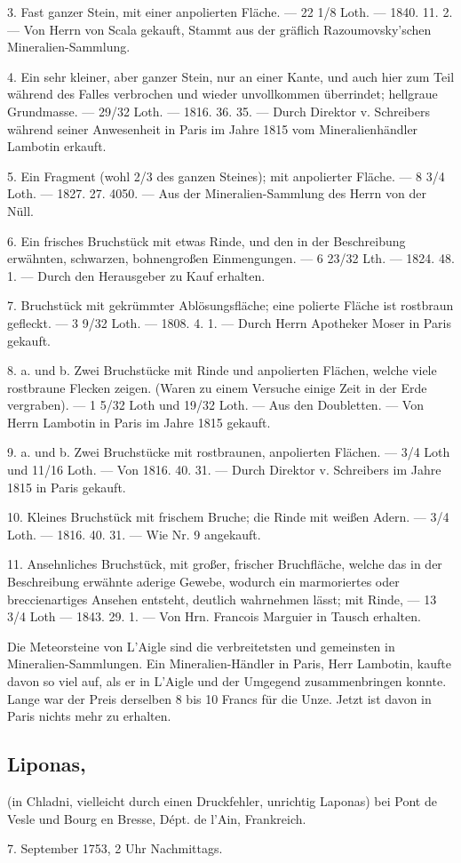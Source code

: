 \documentclass[a4paper, 11pt, oneside, polutonikogreek, german]{article}
\begin{document}
3. Fast ganzer Stein, mit einer anpolierten Fläche. — 22 1/8 Loth. — 1840. 11. 2. — Von Herrn von Scala gekauft, Stammt aus der gräflich Razoumovsky'schen Mineralien-Sammlung.

4. Ein sehr kleiner, aber ganzer Stein, nur an einer Kante, und auch hier zum Teil während des Falles verbrochen und wieder unvollkommen überrindet; hellgraue Grundmasse. — 29/32 Loth. — 1816. 36. 35. — Durch Direktor v. Schreibers während seiner Anwesenheit in Paris im Jahre 1815 vom Mineralienhändler Lambotin erkauft.

5. Ein Fragment (wohl 2/3 des ganzen Steines); mit anpolierter Fläche. — 8 3/4 Loth. — 1827. 27. 4050. — Aus der Mineralien-Sammlung des Herrn von der Nüll.

6. Ein frisches Bruchstück mit etwas Rinde, und den in der Beschreibung erwähnten, schwarzen, bohnengroßen Einmengungen. — 6 23/32 Lth. — 1824. 48. 1. — Durch den Herausgeber zu Kauf erhalten.

7. Bruchstück mit gekrümmter Ablösungsfläche; eine polierte Fläche ist rostbraun gefleckt. — 3 9/32 Loth. — 1808. 4. 1. — Durch Herrn Apotheker Moser in Paris gekauft.

8. a. und b. Zwei Bruchstücke mit Rinde und anpolierten Flächen, welche viele rostbraune Flecken zeigen. (Waren zu einem Versuche einige Zeit in der Erde vergraben). — 1 5/32 Loth und 19/32 Loth. — Aus den Doubletten. — Von Herrn Lambotin in Paris im Jahre 1815 gekauft.

9. a. und b. Zwei Bruchstücke mit rostbraunen, anpolierten Flächen. — 3/4 Loth und 11/16 Loth. — Von 1816. 40. 31. — Durch Direktor v. Schreibers im Jahre 1815 in Paris gekauft.

10. Kleines Bruchstück mit frischem Bruche; die Rinde mit weißen Adern. — 3/4 Loth. — 1816. 40. 31. — Wie Nr. 9 angekauft.

11. Ansehnliches Bruchstück, mit großer, frischer Bruchfläche, welche das in der Beschreibung erwähnte aderige Gewebe, wodurch ein marmoriertes oder breccienartiges Ansehen entsteht, deutlich wahrnehmen lässt; mit Rinde, — 13 3/4 Loth — 1843. 29. 1. — Von Hrn. Francois Marguier in Tausch erhalten.

Die Meteorsteine von L’Aigle sind die verbreitetsten und gemeinsten in Mineralien-Sammlungen. Ein Mineralien-Händler in Paris, Herr Lambotin, kaufte davon so viel auf, als er in L’Aigle und der Umgegend zusammenbringen konnte. Lange war der Preis derselben 8 bis 10 Francs für die Unze. Jetzt ist davon in Paris nichts mehr zu erhalten.
\subsection{Liponas,}
\begin{center}
\small
(in Chladni, vielleicht durch einen Druckfehler, unrichtig Laponas) bei Pont de Vesle und Bourg en Bresse, Dépt. de l'Ain, Frankreich.

7. September 1753, 2 Uhr Nachmittags.
\end{center}
\end{document}
